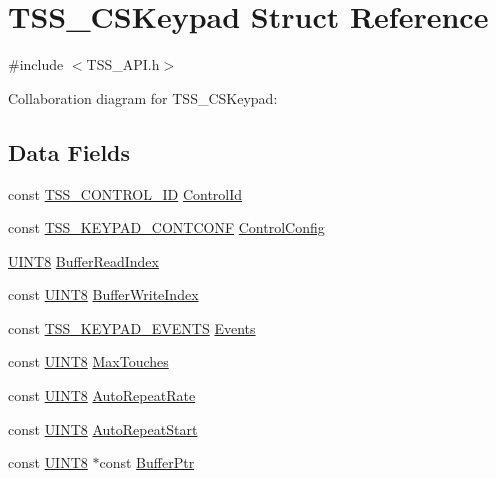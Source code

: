 \hypertarget{struct_t_s_s___c_s_keypad}{}\section{T\+S\+S\+\_\+\+C\+S\+Keypad Struct Reference}
\label{struct_t_s_s___c_s_keypad}


{\ttfamily \#include $<$T\+S\+S\+\_\+\+A\+P\+I.\+h$>$}



Collaboration diagram for T\+S\+S\+\_\+\+C\+S\+Keypad\+:
\subsection*{Data Fields}
\begin{DoxyCompactItemize}
\item 
const \hyperlink{struct_t_s_s___c_o_n_t_r_o_l___i_d}{T\+S\+S\+\_\+\+C\+O\+N\+T\+R\+O\+L\+\_\+\+ID} \hyperlink{struct_t_s_s___c_s_keypad_afcbd53ab3bcf97cfd8d0a8b45863e11a}{Control\+Id}
\item 
const \hyperlink{struct_t_s_s___k_e_y_p_a_d___c_o_n_t_c_o_n_f}{T\+S\+S\+\_\+\+K\+E\+Y\+P\+A\+D\+\_\+\+C\+O\+N\+T\+C\+O\+NF} \hyperlink{struct_t_s_s___c_s_keypad_a629451fe7e0ed2e6b0e100bb705fff9e}{Control\+Config}
\item 
\hyperlink{_t_s_s___data_types_8h_ab27e9918b538ce9d8ca692479b375b6a}{U\+I\+N\+T8} \hyperlink{struct_t_s_s___c_s_keypad_a430bd8cf0503bbcce8995d5999cab857}{Buffer\+Read\+Index}
\item 
const \hyperlink{_t_s_s___data_types_8h_ab27e9918b538ce9d8ca692479b375b6a}{U\+I\+N\+T8} \hyperlink{struct_t_s_s___c_s_keypad_aea235082fcddd9750c16ec653749b8fd}{Buffer\+Write\+Index}
\item 
const \hyperlink{struct_t_s_s___k_e_y_p_a_d___e_v_e_n_t_s}{T\+S\+S\+\_\+\+K\+E\+Y\+P\+A\+D\+\_\+\+E\+V\+E\+N\+TS} \hyperlink{struct_t_s_s___c_s_keypad_af3487ef3716a0cffa3cc5c5cbae6adc0}{Events}
\item 
const \hyperlink{_t_s_s___data_types_8h_ab27e9918b538ce9d8ca692479b375b6a}{U\+I\+N\+T8} \hyperlink{struct_t_s_s___c_s_keypad_a1cdf8334301941e54941c730f203aba8}{Max\+Touches}
\item 
const \hyperlink{_t_s_s___data_types_8h_ab27e9918b538ce9d8ca692479b375b6a}{U\+I\+N\+T8} \hyperlink{struct_t_s_s___c_s_keypad_aef1117c410a59acb56f45d9674e0dd56}{Auto\+Repeat\+Rate}
\item 
const \hyperlink{_t_s_s___data_types_8h_ab27e9918b538ce9d8ca692479b375b6a}{U\+I\+N\+T8} \hyperlink{struct_t_s_s___c_s_keypad_a8c094c8e3ee1f319c131611447cdf3e3}{Auto\+Repeat\+Start}
\item 
const \hyperlink{_t_s_s___data_types_8h_ab27e9918b538ce9d8ca692479b375b6a}{U\+I\+N\+T8} $\ast$const \hyperlink{struct_t_s_s___c_s_keypad_a0579d186b7d45a4117a50ac2a3576df9}{Buffer\+Ptr}
\end{DoxyCompactItemize}


